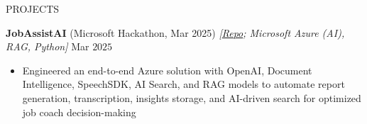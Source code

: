 \documentclass{resume} %
\begin{document}

\begin{rSection}{PROJECTS}

    {\bf JobAssistAI} {(Microsoft Hackathon, Mar 2025)} \textit{[\href{https://github.com/harshitjain17/JobAssistAI}{Repo}; Microsoft Azure (AI), RAG, Python]} \hfill Mar $2025$
    \begin{itemize}[itemsep = -4pt]
        \item Engineered an end-to-end Azure solution with OpenAI, Document Intelligence, SpeechSDK, AI Search, and RAG models to automate report generation, transcription, insights storage, and AI-driven search for optimized job coach decision-making
    \end{itemize}
    
\end{rSection}
\end{document}

